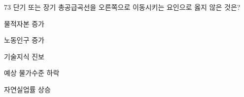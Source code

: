 \begin{question}{73}
단기 또는 장기 총공급곡선을 오른쪽으로 이동시키는 요인으로 옳지 않은 것은?
\begin{choices}
  \item 물적자본 증가
  \item 노동인구 증가
  \item 기술지식 진보
  \item 예상 물가수준 하락
  \item 자연실업률 상승
\end{choices}
\end{question}
